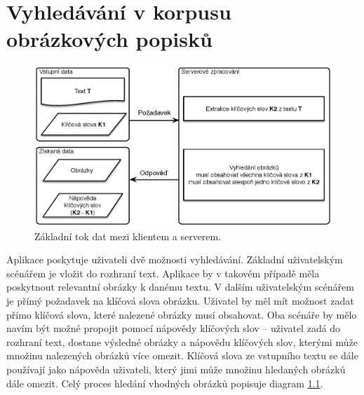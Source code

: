 \chapter{Vyhledávání v korpusu obrázkových popisků}





\begin{figure}
  \centering
  \includegraphics[width=150mm]{dataflow.eps}
  \caption{Základní tok dat mezi klientem a serverem.}
  \label{fig:dataflow}
\end{figure}


Aplikace poskytuje uživateli dvě možnosti vyhledávání. Základní uživatelským scénářem je vložit do rozhraní text. Aplikace by v takovém případě měla poskytnout relevantní obrázky k danému textu. V dalším uživatelským scénářem je přímý požadavek na klíčová slova obrázku. Uživatel by měl mít možnost zadat přímo klíčová slova, které nalezené obrázky musí obsahovat. Oba scénáře by mělo navím být možné propojit pomocí nápovědy klíčových slov -- uživatel zadá do rozhraní text, dostane výsledné obrázky a nápovědu klíčových slov, kterými může množinu nalezených obrázků více omezit. Klíčová slova ze vstupního textu se dále používají jako nápověda uživateli, který jimi může množinu hledaných obrázků dále omezit. Celý proces hledání vhodných obrázků popisuje diagram \ref{fig:dataflow}.



